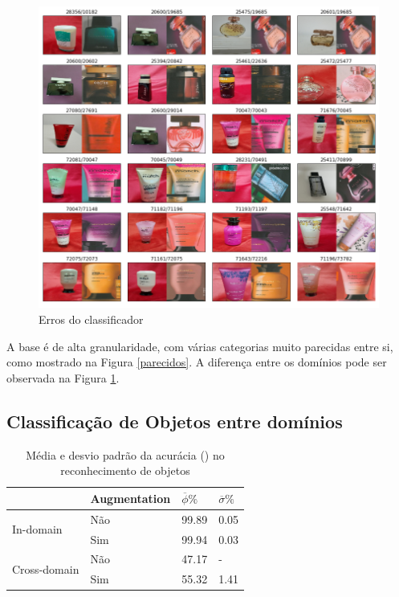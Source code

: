 \documentclass[conference]{IEEEtran}
\begin{document}
\begin{figure}[ht!]
\begin{center}
\includegraphics[width=\columnwidth]{erros.png}
\caption{Erros do classificador}\label{erros}
\end{center}
\end{figure}
A base é de alta granularidade, com várias categorias muito parecidas entre si, como mostrado na Figura \ref{parecidos}. A diferença entre os domínios pode ser observada na Figura \ref{erros}.

\subsection{Classificação de Objetos entre domínios}

\begin{table}[]
\centering
\caption{Média e desvio padrão da acurácia (\phi) no reconhecimento de objetos}
\label{tabela}
\begin{tabular}{@{}llll@{}}
\toprule
 & Augmentation & $\overline{\phi}\%$ & $\overline{\sigma}\%$ \\ \midrule
\multicolumn{1}{l}{\multirow{2}{*}{In-domain}} & \multicolumn{1}{l}{Não} & \multicolumn{1}{l}{99.89} & \multicolumn{1}{l}{0.05} \\ \cmidrule(l){2-4} 
\multicolumn{1}{l}{} & \multicolumn{1}{l}{Sim} & \multicolumn{1}{l}{99.94} & \multicolumn{1}{l}{0.03} \\ \midrule
\multicolumn{1}{l}{\multirow{2}{*}{Cross-domain}} & \multicolumn{1}{l}{Não} & \multicolumn{1}{l}{47.17} & \multicolumn{1.53}{l}{-} \\ \cmidrule(l){2-4} 
\multicolumn{1}{l}{} & \multicolumn{1}{l}{Sim} & \multicolumn{1}{l}{55.32} & \multicolumn{1}{l}{1.41} \\ \bottomrule
\end{tabular}
\end{table}
\end{document}
